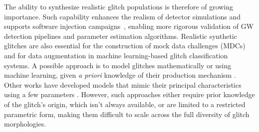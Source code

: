 \documentclass[reprint,nofootinbib,amsmath,amssymb,aps,floatfix]{revtex4-2}
\begin{document}


The ability to synthesize realistic glitch populations is therefore of growing importance.
Such capability enhances the realism of detector simulations and supports software injection campaigns~\cite{Abadie_2010_injection_1, Abadie_2010_injection_2, Virgo_detchar_O3}, enabling more rigorous validation of GW detection pipelines and parameter estimation algorithms.
Realistic synthetic glitches are also essential for the construction of mock data challenges (MDCs) and for data augmentation in machine learning-based glitch classification systems.
A possible approach is to model glitches mathematically or using machine learning, given \textit{a priori} knowledge of their production mechanism \cite{Tolley:2023umc, Chatterjee_2025}. 
Other works have developed models that mimic their principal characteristics using a few parameters \cite{Bondarescu:2023jcx}. 
However, such approaches either require prior knowledge of the glitch's origin, which isn't always available, or are limited to a restricted parametric form, making them difficult to scale across the full diversity of glitch morphologies.

\end{document}
